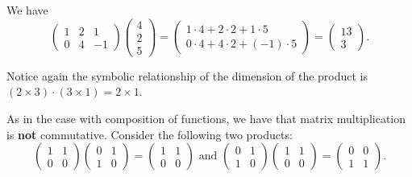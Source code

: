 \begin{example} \label{example 2.3.1}
We have
\[
    \left(\begin{array}{rrr}
        1 & 2 & 1 \\
        0 & 4 & -1
    \end{array}\right)
    \left(\begin{array}{l}
        4 \\
        2 \\
        5
    \end{array}\right)
    =\left(\begin{array}{c}
        1 \cdot 4+2 \cdot 2+1 \cdot 5 \\
        0 \cdot 4+4 \cdot 2+(-1) \cdot 5
    \end{array}\right)
    =\left(\begin{array}{r}
        13 \\
        3
    \end{array}\right).
\]

Notice again the symbolic relationship of the dimension of the product is \((2 \times 3) \cdot (3 \times 1) = 2 \times 1\).
\end{example}

\begin{remark} \label{remark 2.3.3}
As in the case with composition of functions, we have that matrix multiplication is \textbf{not} commutative.
Consider the following two products:
\[
    \left(\begin{array}{ll}
        1 & 1 \\
        0 & 0
    \end{array}\right)
    \left(\begin{array}{ll}
        0 & 1 \\
        1 & 0
    \end{array}\right)
    =\left(\begin{array}{ll}
        1 & 1 \\
        0 & 0
    \end{array}\right)
    \text { and }
    \left(\begin{array}{ll}
        0 & 1 \\
        1 & 0
    \end{array}\right)
    \left(\begin{array}{ll}
        1 & 1 \\
        0 & 0
    \end{array}\right)
    =\left(\begin{array}{ll}
        0 & 0 \\
        1 & 1
    \end{array}\right).
\]
\end{remark}

